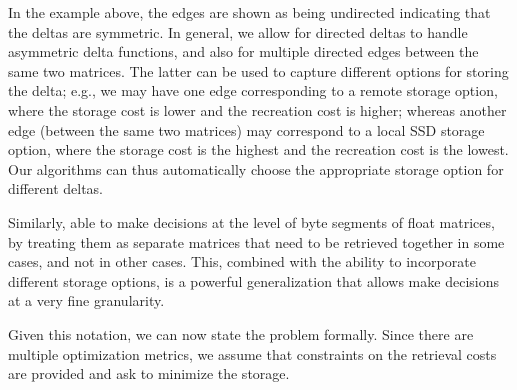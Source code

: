 \documentclass[conference]{IEEEtran}
\begin{document}
In the example above, the edges are shown as being undirected indicating that the deltas are symmetric. In general, we allow for directed deltas to handle asymmetric delta functions, and also for multiple directed edges between the same two matrices. The latter can be used to capture different options for storing the delta; e.g., we may have one edge corresponding to a remote storage option, where the storage cost is lower and the recreation cost is higher; whereas another edge (between the same two matrices) may correspond to a local SSD storage option, where the storage cost is the highest and the recreation cost is the lowest. Our algorithms can thus automatically choose the appropriate storage option for different deltas.


Similarly, \weightstore\is able to make decisions at the level of byte segments of float matrices, by treating them as separate matrices that need to be retrieved together in some cases, and not in other cases. This, combined with the ability to incorporate different storage options, is a powerful generalization that allows \weightstore\to make decisions at a very fine granularity. 



Given this notation, we can now state the problem formally. Since there are multiple optimization metrics, we assume that constraints on the retrieval costs are provided and ask to minimize the storage.
\end{document}
